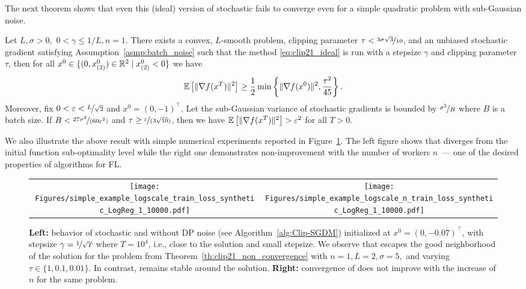 \documentclass[a4paper,11pt]{article}
\begin{document}
The next theorem shows that even this (ideal) version of stochastic  fails to converge even for a simple quadratic problem with sub-Gaussian noise.
\begin{theorem}\label{th:clip21_non_convergence}
    Let $L, \sigma > 0,$ $0 < \gamma \le 1/L, n=1$. There exists a convex, $L$-smooth problem, clipping parameter $\tau < \nicefrac{3\sigma\sqrt{3}}{10}$, and an unbiased stochastic gradient satisfying Assumption~\ref{asmp:batch_noise} such that the method \eqref{eq:clip21_ideal} is run with a stepsize $\gamma$ and clipping parameter $\tau$, then for all $x^0 \in \{(0, x_{(2)}^0) \in\mathbb{R}^2 \mid x_{(2)}^0 < 0\}$
    we have 
    \[
    \mathbb{E}\left[\|\nabla f(x^T)\|^2\right] \ge \frac{1}{2}\min\left\{\|\nabla f(x^0)\|^2, \frac{\tau^2}{45}\right\}.
    \]
    Moreover, fix $0 < \varepsilon  < \nicefrac{L}{\sqrt{2}}$ and $x^0 = (0,-1)^\top.$ Let the sub-Gaussian variance of stochastic gradients is bounded by $\nicefrac{\sigma^2}{B}$ where $B$ is a batch size. If $B < \nicefrac{27\sigma^2}{(60\varepsilon^2)}$ and $\tau \ge \nicefrac{\varepsilon}{(3\sqrt{10})}$, then we have $\mathbb{E}\left[\|\nabla f(x^T)\|^2\right] > \varepsilon^2$ for all $T > 0.$ 
\end{theorem}
We also illustrate the above result with simple numerical experiments reported in Figure~\ref{fig:nonconvergence}. The left figure shows that  diverges from the initial function sub-optimality level while the right one demonstrates non-improvement with the number of workers $n$~--- one of the desired properties of algorithms for FL.



\begin{figure}[!t]
    \centering
    \begin{tabular}{cc}
        \hspace{-3mm}\texttt{[image: Figures/simple\_example\_logscale\_train\_loss\_synthetic\_LogReg\_1\_10000.pdf]} & 
        \hspace{-3mm}\texttt{[image: Figures/simple\_example\_logscale\_n\_train\_loss\_synthetic\_LogReg\_1\_10000.pdf]}
    \end{tabular}
    
    \caption{{\bf Left:} behavior of stochastic  and  without DP noise (see Algorithm~\ref{alg:Clip-SGDM}) initialized at $x^0 = (0, -0.07)^\top$,  with stepsize $\gamma = \nicefrac{1}{\sqrt{T}}$ where $T=10^4$, i.e., close to the solution and small stepsize. We observe that  escapes the good neighborhood of the solution for the problem from Theorem~\ref{th:clip21_non_convergence} with $n=1, L=2, \sigma=5,$ and varying $\tau \in\{1,0.1,0.01\}.$ In contrast,  remains stable around the solution. {\bf Right:} convergence of  does not improve with the increase of $n$ for the same problem.}
    \label{fig:nonconvergence}
\end{figure}
\end{document}
